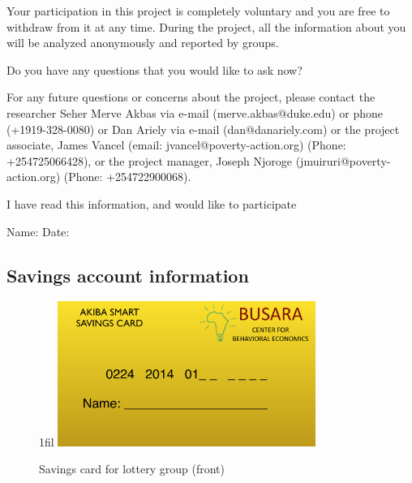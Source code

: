 \documentclass[11pt]{article}
\makeatletter
\newcommand*{\centerfloat}{%
  \parindent \z@
  \leftskip \z@ \@plus 1fil \@minus \textwidth
  \rightskip\leftskip
  \parfillskip \z@skip}
\makeatother
\begin{document}
        \noindent Your participation in this project is completely voluntary and you are free to withdraw from it at any time.  During the project, all the information about you will be analyzed anonymously and reported by groups.

        \vspace{5mm}

        \noindent Do you have any questions that you would like to ask now?

        \vspace{5mm}

        \noindent For any future questions or concerns about the project, please contact the researcher Seher Merve Akbas via e-mail (merve.akbas@duke.edu) or phone (+1919-328-0080) or Dan Ariely via e-mail (dan@danariely.com) or the project associate, James Vancel (email: jvancel@poverty-action.org) (Phone: +254725066428), or the project manager, Joseph Njoroge (jmuiruri@poverty-action.org) (Phone: +254722900068).

        \vspace{5mm}

        \noindent I have read this information, and would like to participate

        \vspace{5mm}

        \noindent Name: \qquad Date:

    \subsection{Savings account information}

        \begin{figure}[h]
        \centering
        \caption{Savings card for lottery group (front)}
        \centerfloat
        \includegraphics[width=0.75\textwidth]{../../figures/id_front.pdf}
        \end{figure}
\end{document}
